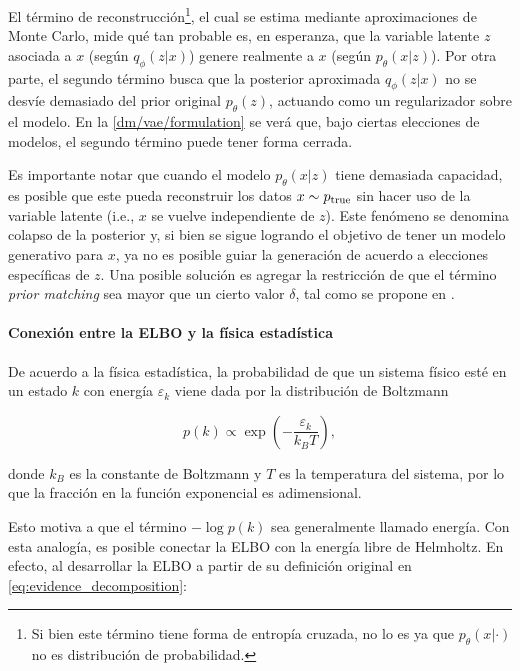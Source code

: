 El término de reconstrucción\footnote{Si bien este término tiene forma de entropía cruzada, no lo es ya que $p_\theta(x|\cdot)$ no es distribución de probabilidad.}, el cual se estima mediante aproximaciones de Monte Carlo, mide qué tan probable es, en esperanza, que la variable latente $z$ asociada a $x$ (según $q_\phi(z|x)$) genere realmente a $x$ (según $p_\theta(x|z)$). Por otra parte, el segundo término busca que la posterior aproximada $q_\phi(z|x)$ no se desvíe demasiado del prior original $p_\theta(z)$, actuando como un regularizador sobre el modelo. En la \autoref{dm/vae/formulation} se verá que, bajo ciertas elecciones de modelos, el segundo término puede tener forma cerrada.

Es importante notar que cuando el modelo $p_\theta(x|z)$ tiene demasiada capacidad, es posible que este pueda reconstruir los datos $x\sim p_{\operatorname{true}}$ sin hacer uso de la variable latente (i.e., $x$ se vuelve independiente de $z$). Este fenómeno se denomina colapso de la posterior y, si bien se sigue logrando el objetivo de tener un modelo generativo para $x$, ya no es posible guiar la generación de acuerdo a elecciones específicas de $z$. Una posible solución es agregar la restricción de que el término \textit{prior matching} sea mayor que un cierto valor $\delta$, tal como se propone en \cite{razavi2019preventing}.

\paragraph{Conexión entre la ELBO y la física estadística}

De acuerdo a la física estadística, la probabilidad de que un sistema físico esté en un estado $k$ con energía $\varepsilon_k$ viene dada por la distribución de Boltzmann

\begin{equation}
    \label{eq:boltzmann}
    p(k) \propto \exp\left(-\frac{\varepsilon_k}{k_B T}\right),
\end{equation}

donde $k_B$ es la constante de Boltzmann y $T$ es la temperatura del sistema, por lo que la fracción en la función exponencial es adimensional.

Esto motiva a que el término $-\log p(k)$ sea generalmente llamado energía. Con esta analogía, es posible conectar la ELBO con la energía libre de Helmholtz. En efecto, al desarrollar la ELBO a partir de su definición original en \eqref{eq:evidence_decomposition}:

